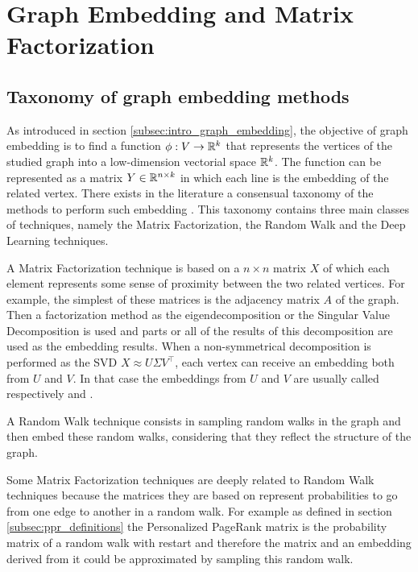\section{Graph Embedding and Matrix Factorization}
\subsection{Taxonomy of graph embedding methods}
As introduced in section \ref{subsec:intro_graph_embedding}, the objective of graph embedding is to find a function $\phi: V \rightarrow \mathbb{R}^k$ that represents the vertices of the studied graph into a low-dimension vectorial space $\mathbb{R}^k$. The function can be represented as a matrix $Y \in \mathbb{R}^{n\times k}$ in which each line is the embedding of the related vertex. There exists in the literature a consensual taxonomy of the methods to perform such embedding \cite{cai2018_ComprehensiveSurveyGraph, goyal2018_GraphEmbeddingTechniques}. This taxonomy contains three main classes of techniques, namely the Matrix Factorization, the Random Walk and the Deep Learning techniques.

A Matrix Factorization technique is based on a $n \times n$ matrix $X$ of which each element represents some sense of proximity between the two related vertices. For example, the simplest of these matrices is the adjacency matrix $A$ of the graph. Then a factorization method as the eigendecomposition or the Singular Value Decomposition is used and parts or all of the results of this decomposition are used as the embedding results. When a non-symmetrical decomposition is performed as the SVD $X \approx U \Sigma V^\top$, each vertex can receive an embedding both from $U$ and $V$. In that case the embeddings from $U$ and $V$ are usually called respectively  and .

A Random Walk technique consists in sampling random walks in the graph and then embed these random walks, considering that they reflect the structure of the graph.

Some Matrix Factorization techniques are deeply related to Random Walk techniques because the matrices they are based on represent probabilities to go from one edge to another in a random walk. For example as defined in section \ref{subsec:ppr_definitions} the Personalized PageRank matrix is the probability matrix of a random walk with restart and therefore the matrix and an embedding derived from it could be approximated by sampling this random walk.

